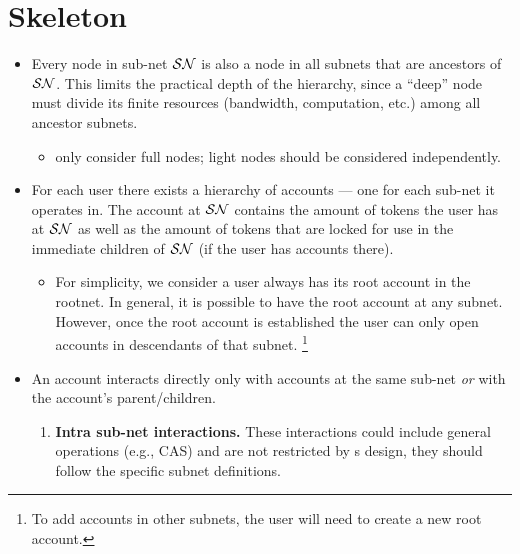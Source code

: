 \section{Skeleton}
\label{sec:Skeleton}

\begin{itemize}
    \item Every node in sub-net $\mathcal{SN}$ is also a node in all subnets that are ancestors of $\mathcal{SN}$. 
    This limits the practical depth of the hierarchy, since a ``deep'' node must divide its finite resources (bandwidth, computation, etc.) among all ancestor subnets. 
    \begin{itemize}
        \item only consider full nodes; light nodes should be considered independently.
    \end{itemize}
    \item For each user there exists a hierarchy of accounts --- one for each sub-net it operates in. The account at $\mathcal{SN}$ contains the amount of tokens the user has at $\mathcal{SN}$ as well as the amount of tokens that are locked for use in the immediate children of $\mathcal{SN}$ (if the user has accounts there). 
    \begin{itemize}
        \item For simplicity, we consider a user always has its root account in the rootnet. In general, it is possible to have the root account at any subnet. However, once the root account is established the user can only open accounts in descendants of that subnet.%
        \footnote{To add accounts in other subnets, the user will need to create a new root account.}
    \end{itemize}
    \item An account interacts directly only with accounts at the same sub-net \textit{or} with the account's parent/children. 
    \begin{enumerate}
        \item \textbf{Intra sub-net interactions.} These interactions could include general operations (e.g., CAS) and are not restricted by \hc s design, they should follow the specific subnet definitions.

\end{enumerate}
\end{itemize}
